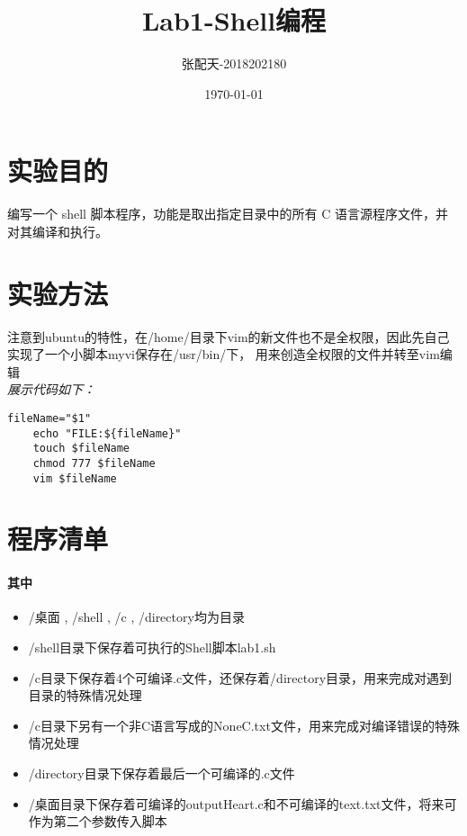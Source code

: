 \documentclass[UTF8]{ctexart}
\title{Lab1-Shell编程}
\author{张配天-2018202180}
\date{\today}
\begin{document}
    \kaishu
    \maketitle
    \thispagestyle{headings}
    \tableofcontents
    \newpage
    \section{实验目的}
    编写一个 shell 脚本程序，功能是取出指定目录中的所有 C 语言源程序文件，并对其编译和执行。 
    \section{实验方法}
    注意到ubuntu的特性，在/home/目录下vim的新文件也不是全权限，因此先自己实现了一个小脚本myvi保存在/usr/bin/下，
    用来创造全权限的文件并转至vim编辑\\
    \emph{展示代码如下：}
    \begin{lstlisting}[] 
    fileName="$1"
    echo "FILE:${fileName}"
    touch $fileName
    chmod 777 $fileName
    vim $fileName
    \end{lstlisting} 

    \section{程序清单}
    \newpage
    \paragraph{其中}
    \begin{itemize}
        \item /桌面 , /shell , /c , /directory均为目录
        \item /shell目录下保存着可执行的Shell脚本lab1.sh
        \item /c目录下保存着4个可编译.c文件，还保存着/directory目录，用来完成对遇到目录的特殊情况处理
        \item /c目录下另有一个非C语言写成的NoneC.txt文件，用来完成对编译错误的特殊情况处理
        \item /directory目录下保存着最后一个可编译的.c文件
        \item /桌面目录下保存着可编译的outputHeart.c和不可编译的text.txt文件，将来可作为第二个参数传入脚本
    \end{itemize}
\end{document}

